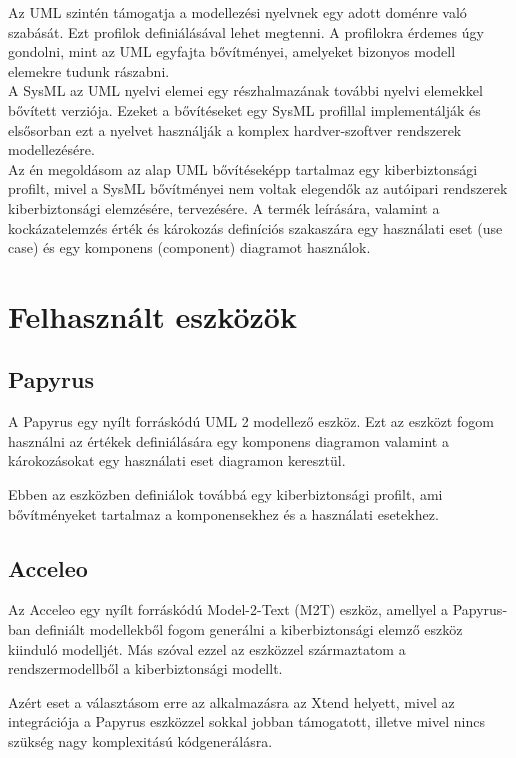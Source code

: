 Az UML szintén támogatja a modellezési nyelvnek egy adott doménre való szabását. Ezt profilok definiálásával lehet megtenni. A profilokra érdemes úgy gondolni, mint az UML egyfajta bővítményei, amelyeket bizonyos modell elemekre tudunk rászabni.\\


A SysML az UML nyelvi elemei egy részhalmazának további nyelvi elemekkel bővített verziója. Ezeket a bővítéseket egy SysML profillal implementálják és elsősorban ezt a nyelvet használják a komplex hardver-szoftver rendszerek modellezésére.\\


Az én megoldásom az alap UML bővítéseképp tartalmaz egy kiberbiztonsági profilt, mivel a SysML bővítményei nem voltak elegendők az autóipari rendszerek kiberbiztonsági elemzésére, tervezésére. A termék leírására, valamint a kockázatelemzés érték és károkozás definíciós szakaszára egy használati eset (use case) és egy komponens (component) diagramot használok.

\section{Felhasznált eszközök}

\subsection{Papyrus}

A Papyrus egy nyílt forráskódú UML 2 modellező eszköz. Ezt az eszközt fogom használni az értékek definiálására egy komponens diagramon valamint a károkozásokat egy használati eset diagramon keresztül.

Ebben az eszközben definiálok továbbá egy kiberbiztonsági profilt, ami bővítményeket tartalmaz a komponensekhez és a használati esetekhez.

\subsection{Acceleo}

Az Acceleo egy nyílt forráskódú Model-2-Text (M2T) eszköz, amellyel a Papyrus-ban definiált modellekből fogom generálni a kiberbiztonsági elemző eszköz kiinduló modelljét. Más szóval ezzel az eszközzel származtatom a rendszermodellből a kiberbiztonsági modellt.

Azért eset a választásom erre az alkalmazásra az Xtend helyett, mivel az integrációja a Papyrus eszközzel sokkal jobban támogatott, illetve mivel nincs szükség nagy komplexitású kódgenerálásra.

